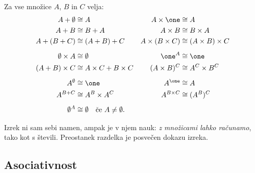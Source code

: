 \begin{izrek}
  \label{izrek:aritmetika-mnozic}
  Za vse množice $A$, $B$ in $C$ velja:
  \begin{align*}
    A + \emptyset &\cong A                   &     A \times \one &\cong A \\
    A + B &\cong B + A               &     A \times B &\cong B \times A \\
    A + (B + C) &\cong (A + B) + C   &     A \times (B \times C) &\cong (A \times B) \times C \\[1ex]
    \emptyset \times A &\cong \emptyset                           &   \one^A &\cong \one \\
    (A + B) \times C &\cong A \times C + B \times C &   (A \times B)^C &\cong A^C \times B^C \\[1ex]
    A^\emptyset &\cong \one                     &   A^{\one} &\cong A \\
    A^{B + C} &\cong A^B \times A^C   &   A^{B \times C} &\cong (A^B)^C \\[1ex]
    \emptyset^A &\cong \emptyset \quad \text{če $A \neq \emptyset$.}
  \end{align*}
\end{izrek}

Izrek ni sam sebi namen, ampak je v njem nauk: \emph{z množicami lahko računamo}, tako kot
s števili. Preostanek razdelka je posvečen dokazu izreka.

\subsection{Asociativnost}
\label{sec:asociativnost}

